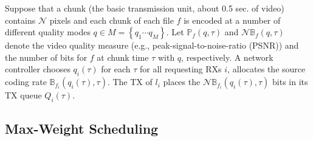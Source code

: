 \documentclass[journal]{IEEEtran}
\begin{document}
Suppose that a chunk (the basic transmission unit, about 0.5 sec. of video) contains $\mathcal{N}$ pixels and each chunk of each file $f$ is encoded at a number of different quality modes $q \in M=\left\{q_{1}\cdots q_{M}\right\}$.
Let $\mathbb{P}_{f}(q, \tau)$ and $\mathcal{N}\mathbb{B}_{f}(q, \tau)$ denote
    the video quality measure (e.g., peak-signal-to-noise-ratio (PSNR))
    and the number of bits for $f$ at chunk time $\tau$ with $q$, respectively.
A network controller
    chooses $q_{i}(\tau)$ for each $\tau$ for all requesting RXs $i$,
    allocates the source coding rate $\mathbb{B}_{f_{i}}(q_{i}(\tau), \tau)$.
The TX of $l_{i}$ places the $\mathcal{N}\mathbb{B}_{f_{i}}(q_{i}(\tau), \tau)$ bits in its TX queue $Q_{i}(\tau)$.

 \vspace{-1.0mm}

\subsection{Max-Weight Scheduling}
\end{document}
